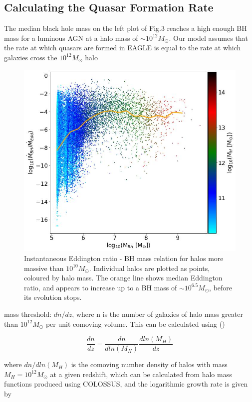 \documentclass[12pt, twocolumn]{report}%
\begin{document}
 \subsection{Calculating the Quasar Formation Rate}

The median black hole mass on the left plot of Fig.3 reaches a high enough BH mass for a luminous AGN at a halo mass of $\sim10^{12}M_\odot$. Our model assumes that the rate at which quasars are formed in EAGLE is equal to the rate at which galaxies cross the $10^{12}M_\odot$ halo 

\begin{figure}[H]
\centering
\includegraphics[width=\linewidth]{Plot_12.jpeg}
\caption{Instantaneous Eddington ratio - BH mass relation for halos more massive than $10^{10}M_\odot$. Individual halos are plotted as points, coloured by halo mass. The orange line shows median Eddington ratio, and appears to increase up to a BH mass of $\sim10^{6.5}M_\odot$, before its evolution stops.}
\label{fig:4}
\end{figure}

mass threshold: $dn/dz$, where n is the number of galaxies of halo mass greater than $10^{12}M_\odot$ per unit comoving volume. This can be calculated using (\cite{Correa})

\begin{equation}
    \frac{dn}{dz}=\frac{dn}{dln(M_H)}\frac{dln(M_H)}{dz}
\end{equation}

\noindent where $dn/dln(M_H)$ is the comoving number density of halos with mass $M_H=10^{12}M_\odot$ at a given redshift, which can be calculated from halo mass functions produced using COLOSSUS, and the logarithmic growth rate is given by
\end{document}
